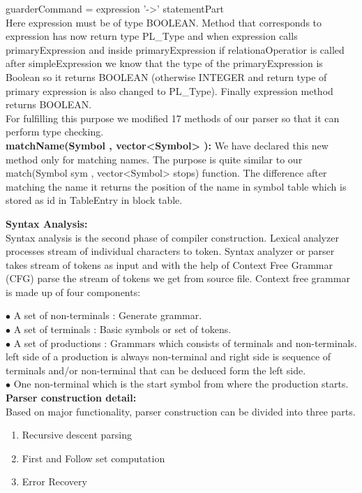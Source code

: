 \documentclass[paper=letter, fontsize=11pt]{scrartcl} %
\begin{document}
guarderCommand = expression '->' statementPart\\

Here expression must be of type BOOLEAN. Method that corresponds to expression has now return type PL\_Type and when expression calls primaryExpression and inside primaryExpression if relationaOperatior is called after simpleExpression we know that the type of the primaryExpression is Boolean so it returns BOOLEAN (otherwise INTEGER and return type of primary expression is also changed to PL\_Type). Finally expression method returns BOOLEAN. \\
For fulfilling this purpose we modified 17 methods of our parser so that it can perform type checking.\\

{\bf matchName(Symbol , vector<Symbol> ):}
We have declared this new method only for matching names. The purpose is quite similar to our match(Symbol sym , vector<Symbol> stops) function. The difference after matching the name it returns the position of the name in symbol table which is stored as id in TableEntry in block table.           

\pagebreak

{\bf {\huge Syntax Analysis:}}\\
Syntax analysis is the second phase of compiler construction. Lexical analyzer processes stream of individual characters to token. Syntax analyzer or parser takes stream of tokens as input and with the help of Context Free Grammar (CFG) parse the stream of tokens we get from source file. Context free grammar is made up of four components:

$\bullet$ A set of non-terminals : Generate grammar.\\
$\bullet$ A set of terminals : Basic symbols or set of tokens.\\
$\bullet$ A set of productions : Grammars which consists of terminals and non-terminals. left side of a production is always non-terminal and right side is sequence of terminals and/or non-terminal that can be deduced form the left side.\\
$\bullet$ One non-terminal which is the start symbol from where the production starts.\\


{\bf Parser construction detail:}\\

Based on major functionality, parser construction can be divided into three parts.
\begin{enumerate}  
\item Recursive descent parsing 
\item First and Follow set computation
\item Error Recovery
\end{enumerate}
\end{document}
